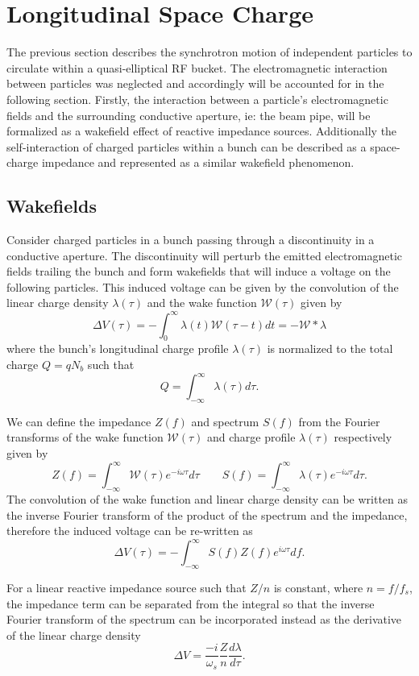 \section{Longitudinal Space Charge}

The previous section describes the synchrotron motion of independent particles to circulate within a quasi-elliptical RF bucket. The electromagnetic interaction between particles was neglected and accordingly will be accounted for in the following section. Firstly, the interaction between a particle's electromagnetic fields and the surrounding conductive aperture, ie: the beam pipe, will be formalized as a wakefield effect of reactive impedance sources. Additionally the self-interaction of charged particles within a bunch can be described as a space-charge impedance and represented as a similar wakefield phenomenon.

\subsection{Wakefields}

Consider charged particles in a bunch passing through a discontinuity in a conductive aperture. The discontinuity will perturb the emitted electromagnetic fields trailing the bunch and form wakefields that will induce a voltage on the following particles. This induced voltage can be given by the convolution of the linear charge density $\lambda(\tau)$ and the wake function $\mathcal{W}(\tau)$ given by \cite{wiedemann_particle_2015,zotter_impedances_1998}
$$\Delta V(\tau)=-\int_0^\infty\lambda(t)\mathcal{W}(\tau-t)dt=-\mathcal{W}*\lambda$$
where the bunch's longitudinal charge profile $\lambda(\tau)$ is normalized to the total charge $Q=qN_b$ such that $$Q = \int_{-\infty}^\infty \lambda(\tau) d\tau.$$

We can define the impedance $Z(f)$ and spectrum $S(f)$ from the Fourier transforms of the wake function $\mathcal{W}(\tau)$ and charge profile $\lambda(\tau)$ respectively given by
$$Z(f)  =\int_{-\infty}^\infty\mathcal{W}(\tau)e^{-i\omega\tau}d\tau \qquad S(f)  =\int_{-\infty}^\infty\lambda(\tau)e^{-i\omega\tau}d\tau.$$
The convolution of the wake function and linear charge density can be written as the inverse Fourier transform of the product of the spectrum and the impedance, therefore the induced voltage can be re-written as
$$\Delta V(\tau)=-\int_{-\infty}^\infty S(f)Z(f)e^{i\omega \tau}df.$$

For a linear reactive impedance source such that $Z/n$ is constant, where $n = f/f_s$, the impedance term can be separated from the integral so that the inverse Fourier transform of the spectrum can be incorporated instead as the derivative of the linear charge density
\begin{equation}
    \Delta V=\frac{-i}{\omega_s}\frac{Z}{n}\frac{d\lambda}{d\tau}
    \label{eq:induced_voltage}.
\end{equation}

